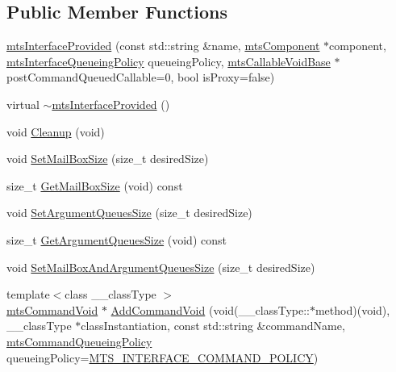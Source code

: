 \subsection*{Public Member Functions}
\begin{DoxyCompactItemize}
\item 
\hyperlink{classmts_interface_provided_a6712188f9a49482f9ed5b31e738bf15d}{mts\+Interface\+Provided} (const std\+::string \&name, \hyperlink{classmts_component}{mts\+Component} $\ast$component, \hyperlink{mts_forward_declarations_8h_abedfb5c45b329a89b0fb647a96a7c938}{mts\+Interface\+Queueing\+Policy} queueing\+Policy, \hyperlink{classmts_callable_void_base}{mts\+Callable\+Void\+Base} $\ast$post\+Command\+Queued\+Callable=0, bool is\+Proxy=false)
\item 
virtual \hyperlink{classmts_interface_provided_aff3337b8fc5eba462f092a5a1d20cb0e}{$\sim$mts\+Interface\+Provided} ()
\item 
void \hyperlink{classmts_interface_provided_af428e5d63e5b27dfc3c141f17da26261}{Cleanup} (void)
\item 
void \hyperlink{classmts_interface_provided_aefa3e9ac82cb5f721f97fe919c53fae9}{Set\+Mail\+Box\+Size} (size\+\_\+t desired\+Size)
\item 
size\+\_\+t \hyperlink{classmts_interface_provided_ab1acfab12dd1d09a05f287185898ea05}{Get\+Mail\+Box\+Size} (void) const 
\item 
void \hyperlink{classmts_interface_provided_a2e4c89fa4b335e159d3f2870e92ddaa4}{Set\+Argument\+Queues\+Size} (size\+\_\+t desired\+Size)
\item 
size\+\_\+t \hyperlink{classmts_interface_provided_a9012af2e8998b8c9fa2f4ac5bab6a121}{Get\+Argument\+Queues\+Size} (void) const 
\item 
void \hyperlink{classmts_interface_provided_ab27d45daf220e7818ed5b4b485a6cacf}{Set\+Mail\+Box\+And\+Argument\+Queues\+Size} (size\+\_\+t desired\+Size)
\item 
{\footnotesize template$<$class \+\_\+\+\_\+class\+Type $>$ }\\\hyperlink{classmts_command_void}{mts\+Command\+Void} $\ast$ \hyperlink{classmts_interface_provided_aaf729c49f57f0089610e7e8e0638e76a}{Add\+Command\+Void} (void(\+\_\+\+\_\+class\+Type\+::$\ast$method)(void), \+\_\+\+\_\+class\+Type $\ast$class\+Instantiation, const std\+::string \&command\+Name, \hyperlink{mts_forward_declarations_8h_aa2ac24035e136fa1689dcc2854c63fc7}{mts\+Command\+Queueing\+Policy} queueing\+Policy=\hyperlink{mts_forward_declarations_8h_aa2ac24035e136fa1689dcc2854c63fc7a4f444b4120a5e2efd084e2e5a214f5c8}{M\+T\+S\+\_\+\+I\+N\+T\+E\+R\+F\+A\+C\+E\+\_\+\+C\+O\+M\+M\+A\+N\+D\+\_\+\+P\+O\+L\+I\+C\+Y})

\end{DoxyCompactItemize}
